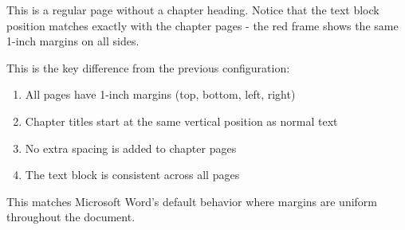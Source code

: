 \documentclass[12pt,oneside,a4paper]{report}
\begin{document}
\newpage

This is a regular page without a chapter heading. Notice that the text block position matches exactly with the chapter pages - the red frame shows the same 1-inch margins on all sides.

This is the key difference from the previous configuration:
\begin{enumerate}
\item All pages have 1-inch margins (top, bottom, left, right)
\item Chapter titles start at the same vertical position as normal text
\item No extra spacing is added to chapter pages
\item The text block is consistent across all pages
\end{enumerate}

This matches Microsoft Word's default behavior where margins are uniform throughout the document.
\end{document}
